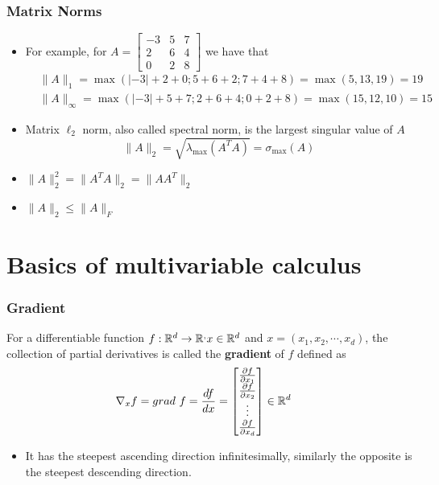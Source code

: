 \begin{frame}\frametitle{Matrix Norms}
    \begin{itemize}
        \item For example, for
        $A=\left[\begin{array}{ccc}
        -3 & 5 & 7 \\
        2 & 6 & 4 \\
        0 & 2 & 8
        \end{array}\right]
        $
        we have that
        $$
        \begin{aligned}
        & \|A\|_1=\max (|-3|+2+0 ; 5+6+2 ; 7+4+8)=\max (5,13,19)=19 \\
        & \|A\|_{\infty}=\max (|-3|+5+7 ; 2+6+4 ; 0+2+8)=\max (15,12,10)=15
        \end{aligned}
        $$
        \item Matrix $\ell_2$ norm, also called spectral norm, is the largest singular value of $A$ $$\|A\|_2=\sqrt{\lambda_{\max }\left(A^T A\right)}=\sigma_{\max }(A)$$
        \item $\|A\|_2^2=\|A^TA\|_2=\|AA^T\|_2$
        \item $\|A\|_2\leq\|A\|_F$
    \end{itemize}
\end{frame}

\section{Basics of multivariable calculus}

\begin{frame}\frametitle{Gradient}
    For a differentiable function $f:{\mathbb R}^{d}\to{\mathbb R}^{,} x\in{\mathbb R}^{d}$ and $x=(x_1,x_2,\cdots,x_d)$, the collection of partial derivatives 
    is called the \textbf{gradient} of $f$ defined as
    \begin{align*}
        \nabla_xf=grad\ f=\frac{df}{dx}&= \begin{bmatrix}
            \frac{\partial f}{\partial x_1} \\
            \frac{\partial f}{\partial x_2} \\
               \vdots \\
               \frac{\partial f}{\partial x_d}
             \end{bmatrix}\in{\mathbb R}^{d}
      \end{align*}
      \begin{itemize}
        \item It has the steepest ascending direction infinitesimally, similarly the opposite is the steepest descending direction.
      \end{itemize}    
\end{frame}

